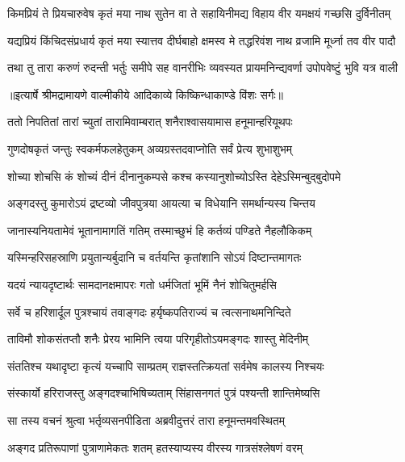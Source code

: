\fourlineindentedshloka
{किमप्रियं ते प्रियचारुवेष}
{ कृतं मया नाथ सुतेन वा ते}
{सहायिनीमद्य विहाय वीर}
{ यमक्षयं गच्छसि दुर्विनीतम्} %

\fourlineindentedshloka
{यद्यप्रियं किंचिदसंप्रधार्य}
{ कृतं मया स्यात्तव दीर्घबाहो}
{क्षमस्व मे तद्धरिवंश नाथ}
{ व्रजामि मूर्ध्ना तव वीर पादौ} %

\fourlineindentedshloka
{तथा तु तारा करुणं रुदन्ती}
{ भर्तुः समीपे सह वानरीभिः}
{व्यवस्यत प्रायमनिन्द्यवर्णा}
{ उपोपवेष्टुं भुवि यत्र वाली} %


{॥इत्यार्षे श्रीमद्रामायणे वाल्मीकीये आदिकाव्ये किष्किन्धाकाण्डे विंशः सर्गः॥}


\twolineshloka
{ततो निपतितां तारां च्युतां तारामिवाम्बरात्}
{शनैराश्वासयामास हनूमान्हरियूथपः} %

\twolineshloka
{गुणदोषकृतं जन्तुः स्वकर्मफलहेतुकम्}
{अव्यग्रस्तदवाप्नोति सर्वं प्रेत्य शुभाशुभम्} %

\twolineshloka
{शोच्या शोचसि कं शोच्यं दीनं दीनानुकम्पसे}
{कश्च कस्यानुशोच्योऽस्ति देहेऽस्मिन्बुद्बुदोपमे} %

\twolineshloka
{अङ्गदस्तु कुमारोऽयं द्रष्टव्यो जीवपुत्रया}
{आयत्या च विधेयानि समर्थान्यस्य चिन्तय} %

\twolineshloka
{जानास्यनियतामेवं भूतानामागतिं गतिम्}
{तस्माच्छुभं हि कर्तव्यं पण्डिते नैहलौकिकम्} %

\twolineshloka
{यस्मिन्हरिसहस्राणि प्रयुतान्यर्बुदानि च}
{वर्तयन्ति कृतांशानि सोऽयं दिष्टान्तमागतः} %

\twolineshloka
{यदयं न्यायदृष्टार्थः सामदानक्षमापरः}
{गतो धर्मजितां भूमिं नैनं शोचितुमर्हसि} %

\twolineshloka
{सर्वे च हरिशार्दूल पुत्रश्चायं तवाङ्गदः}
{हर्यृष्कपतिराज्यं च त्वत्सनाथमनिन्दिते} %

\twolineshloka
{ताविमौ शोकसंतप्तौ शनैः प्रेरय भामिनि}
{त्वया परिगृहीतोऽयमङ्गदः शास्तु मेदिनीम्} %

\twolineshloka
{संततिश्च यथादृष्टा कृत्यं यच्चापि साम्प्रतम्}
{राज्ञस्तत्क्रियतां सर्वमेष कालस्य निश्चयः} %

\twolineshloka
{संस्कार्यो हरिराजस्तु अङ्गदश्चाभिषिच्यताम्}
{सिंहासनगतं पुत्रं पश्यन्ती शान्तिमेष्यसि} %

\twolineshloka
{सा तस्य वचनं श्रुत्वा भर्तृव्यसनपीडिता}
{अब्रवीदुत्तरं तारा हनूमन्तमवस्थितम्} %

\twolineshloka
{अङ्गद प्रतिरूपाणां पुत्राणामेकतः शतम्}
{हतस्याप्यस्य वीरस्य गात्रसंश्लेषणं वरम्} %

